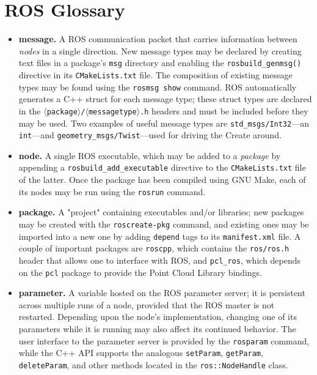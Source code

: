 \documentclass[12pt]{report}
\begin{document}
\section{ROS Glossary}
\begin{itemize}
\item{\textbf{message.} A ROS communication packet that carries information between \textit{nodes} in a single direction.  New message types may be declared by creating text files in a package's \texttt{msg} directory and enabling the \texttt{rosbuild\_genmsg()} directive in its \texttt{CMakeLists.txt} file.  The composition of existing message types may be found using the \texttt{rosmsg show} command.  ROS automatically generates a C++ struct for each message type; these struct types are declared in the \texttt{$\langle$package$\rangle$/$\langle$messagetype$\rangle$.h} headers and must be included before they may be used.  Two examples of useful message types are \texttt{std\_msgs/Int32}---an \texttt{int}---and \texttt{geometry\_msgs/Twist}---used for driving the Create around.}
\item{\textbf{node.} A single ROS executable, which may be added to a \textit{package} by appending a \texttt{rosbuild\_add\_executable} directive to the \texttt{CMakeLists.txt} file of the latter.  Once the package has been compiled using GNU Make, each of its nodes may be run using the \texttt{rosrun} command.}
\item{\textbf{package.} A "project" containing executables and/or libraries; new packages may be created with the \texttt{roscreate-pkg} command, and existing ones may be imported into a new one by adding \texttt{depend} tags to its \texttt{manifest.xml} file.  A couple of important packages are \texttt{roscpp}, which contains the \texttt{ros/ros.h} header that allows one to interface with ROS, and \texttt{pcl\_ros}, which depends on the \texttt{pcl} package to provide the Point Cloud Library bindings.}
\item{\textbf{parameter.} A variable hosted on the ROS parameter server; it is persistent across multiple runs of a node, provided that the ROS master is not restarted.  Depending upon the node's implementation, changing one of its parameters while it is running may also affect its continued behavior.  The user interface to the parameter server is provided by the \texttt{rosparam} command, while the C++ API supports the analogous \texttt{setParam}, \texttt{getParam}, \texttt{deleteParam}, and other methods located in the \texttt{ros::NodeHandle} class.}

\end{itemize}
\end{document}
